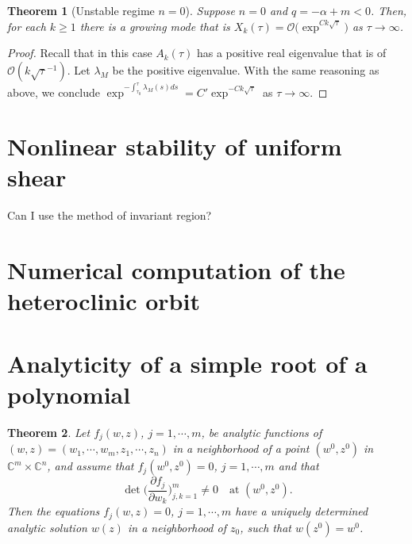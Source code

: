 \documentclass[a4paper,11pt]{article}
\def\blue{\color{blue}}
\newtheorem{theorem}{Theorem}
\theoremstyle{remark}
\begin{document}
\begin{theorem}[Unstable regime $n=0$] Suppose $n=0$ and $q=-\alpha+m<0$. Then, for each $k\ge1$ there is a growing mode that is $X_k(\tau) = \mathcal{O}\Big(\exp^{Ck\sqrt{\tau}}\Big)$ as $\tau \rightarrow \infty$. 
\end{theorem}
\begin{proof}
 Recall that in this case $A_k(\tau)$ has a positive real eigenvalue that is of $\mathcal{O}(k\sqrt{\tau}^{-1})$. Let $\lambda_M$ be the positive eigenvalue. With the same reasoning as above, we conclude $\exp^{-\int_{\tau_0}^{\tau} \lambda_M(s) ds} = C'\exp^{-Ck\sqrt{\tau}}$ as $\tau \rightarrow \infty$.
\end{proof}

\section{Nonlinear stability of uniform shear}
{\blue Can I use the method of invariant region?}
% 
% 

\section{Numerical computation of the heteroclinic orbit}
 

\appendix
\section{Analyticity of a simple root of a polynomial}
\begin{theorem}{\cite[p. 24]{L1966}} Let $f_j(w,z)$, $j=1,\cdots,m$, be analytic functions of $(w,z)=(w_1,\cdots,w_m,z_1,\cdots,z_n)$ in a neighborhood of a point $(w^0,z^0)$ in $\mathbb{C}^m\times \mathbb{C}^n$, and assume that $f_j(w^0,z^0)=0$, $j=1,\cdots,m$ and that
$$ \det\Big( \frac{\partial f_j}{\partial w_k} \Big)_{j,k=1}^m \ne 0 \quad \text{at $(w^0,z^0)$}.$$
Then the equations $f_j(w,z)=0$, $j=1,\cdots,m$ have a uniquely determined analytic solution $w(z)$ in a neighborhood of $z_0$, such that $w(z^0)=w^0$.
\end{theorem}
\end{document}
